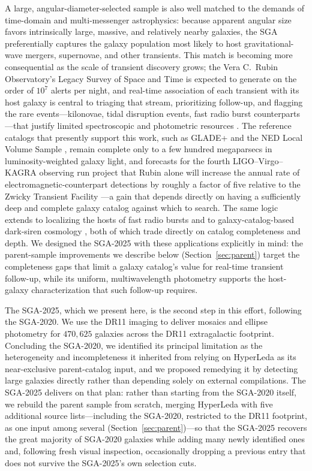 \documentclass[modern,linenumbers]{aastex701}
\begin{document}
A large, angular-diameter-selected sample is also well matched to the
demands of time-domain and multi-messenger astrophysics: because
apparent angular size favors intrinsically large, massive, and
relatively nearby galaxies, the SGA preferentially captures the galaxy
population most likely to host gravitational-wave mergers, supernovae,
and other transients. This match is becoming more consequential as the
scale of transient discovery grows; the Vera C.\ Rubin Observatory's
Legacy Survey of Space and Time is expected to generate on the order
of $10^7$ alerts per night, and real-time association of each
transient with its host galaxy is central to triaging that stream,
prioritizing follow-up, and flagging the rare events---kilonovae,
tidal disruption events, fast radio burst counterparts---that justify
limited spectroscopic and photometric resources
\citep{andreoni24a}. The reference catalogs that presently support
this work, such as GLADE+ \citep{dalya22a} and the NED Local Volume
Sample \citep{cook23a}, remain complete only to a few hundred
megaparsecs in luminosity-weighted galaxy light, and forecasts for the
fourth LIGO--Virgo--KAGRA observing run project that Rubin alone will
increase the annual rate of electromagnetic-counterpart detections by
roughly a factor of five relative to the Zwicky Transient Facility
\citep{kiendrebeogo23a}---a gain that depends directly on having a
sufficiently deep and complete galaxy catalog against which to
search. The same logic extends to localizing the hosts of fast radio
bursts \citep{law24a} and to galaxy-catalog-based dark-siren cosmology
\citep{abbott23a}, both of which trade directly on catalog
completeness and depth. We designed the SGA-2025 with these
applications explicitly in mind: the parent-sample improvements we
describe below (Section~\ref{sec:parent}) target the
completeness gaps that limit a galaxy catalog's value for real-time
transient follow-up, while its uniform, multiwavelength photometry
supports the host-galaxy characterization that such follow-up
requires.

The SGA-2025, which we present here, is the second step in this
effort, following the SGA-2020. We use the DR11 imaging to deliver
mosaics and ellipse photometry for $470{,}625$ galaxies across the DR11
extragalactic footprint. Concluding the SGA-2020, we
identified its principal limitation as the heterogeneity and
incompleteness it inherited from relying on HyperLeda \citep{makarov14a}
as its near-exclusive parent-catalog input, and we proposed remedying it
by detecting large galaxies directly rather than depending solely on
external compilations. The SGA-2025 delivers on that plan: rather than
starting from the SGA-2020 itself, we rebuild the parent sample from
scratch, merging HyperLeda with five additional source lists---including
the SGA-2020, restricted to the DR11 footprint, as one input among several
(Section~\ref{sec:parent})---so that the SGA-2025 recovers the great
majority of SGA-2020 galaxies while adding many newly identified ones and,
following fresh visual inspection, occasionally dropping a previous entry
that does not survive the SGA-2025's own selection cuts.
\end{document}
